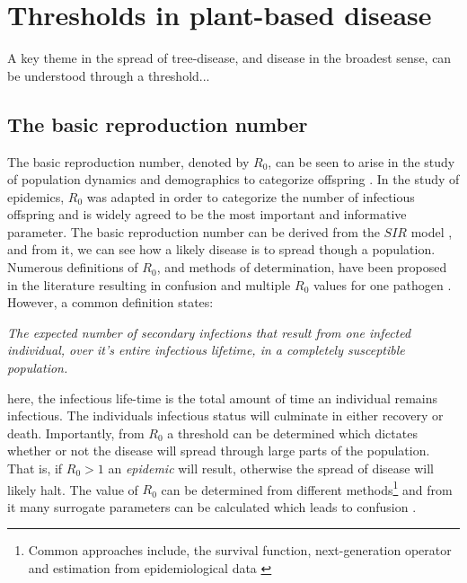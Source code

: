 \section{Thresholds in plant-based disease}

A key theme in the spread of tree-disease, and disease in the broadest sense, can be understood through a threshold...

\subsection{The basic reproduction number}
\label{ch2:R0}
The basic reproduction number, denoted by $R_0$, can be seen to arise in the study of population dynamics and demographics to categorize offspring \cite{heesterbeek2002brief}. In the study of epidemics, $R_0$ was adapted in order to categorize the number of infectious offspring and is widely agreed to be the most important and informative parameter. The basic reproduction number can be derived from the $SIR$ model \cite{kermack-model}, and from it, we can see how a likely disease is to spread though a population. Numerous definitions of $R_0$, and methods of determination, have been proposed in the literature resulting in confusion and multiple $R_0$ values for one pathogen \cite{delamater2019complexity}. However, a common definition states:

\textit{The expected number of secondary infections that result from one infected individual, over it's entire infectious lifetime, in a completely susceptible population.}

here, the infectious life-time is the total amount of time an individual remains infectious. The individuals infectious status will culminate in either recovery or death. Importantly, from $R_0$ a threshold can be determined which dictates whether or not the disease will spread through large parts of the population. That is, if $R_0>1$ an \textit{epidemic} will result, otherwise the spread of disease will likely halt. The value of $R_0$ can be determined from different methods\footnote{Common approaches include, the survival function, next-generation operator and estimation from epidemiological data \cite{perspectives-on-r0}} and from it many surrogate parameters can be calculated which leads to confusion \cite{diekmann2010construction}.

